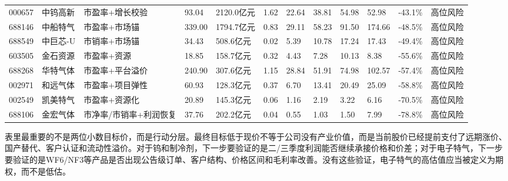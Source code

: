 \begin{exhibitbox}[完整估值总表]
{\begin{tabular}{llllllllllll}
000657 & 中钨高新 & 市盈率+增长校验 & 93.04 & 2120.0亿元 & 1.62 & 22.64 & 38.81 & 54.98 & 52.98 & -43.1\% & 高位风险 \\
688146 & 中船特气 & 市盈率+市场锚 & 339.00 & 1794.7亿元 & 0.83 & 29.11 & 58.23 & 91.50 & 174.66 & -48.5\% & 高位风险 \\
688549 & 中巨芯-U & 市销率+市场锚 & 34.43 & 508.6亿元 & 0.02 & 5.39 & 10.78 & 17.24 & 17.43 & -49.4\% & 高位风险 \\
603505 & 金石资源 & 市盈率+资源 & 18.85 & 158.7亿元 & 0.32 & 4.43 & 7.28 & 10.13 & 8.38 & -55.6\% & 高位风险 \\
688268 & 华特气体 & 市盈率+平台溢价 & 240.90 & 307.6亿元 & 1.15 & 28.84 & 51.91 & 74.98 & 102.57 & -57.4\% & 高位风险 \\
002971 & 和远气体 & 市盈率+项目弹性 & 60.93 & 128.3亿元 & 0.37 & 6.70 & 13.41 & 20.49 & 25.09 & -58.8\% & 高位风险 \\
002549 & 凯美特气 & 市盈率+资源化 & 20.89 & 145.3亿元 & 0.06 & 1.16 & 2.19 & 3.22 & 6.16 & -70.5\% & 高位风险 \\
688106 & 金宏气体 & 市净率/市销率+利润恢复 & 37.76 & 202.2亿元 & 0.04 & 0.55 & 1.03 & 1.50 & 7.99 & -78.8\% & 高位风险 \\
\bottomrule
\end{tabular}
}
\end{exhibitbox}

表里最重要的不是两位小数目标价，而是行动分层。最终目标低于现价不等于公司没有产业价值，而是当前股价已经提前支付了远期涨价、国产替代、客户认证和流动性溢价。对于钨和制冷剂，下一步要验证的是二/三季度利润能否继续承接价格和价差；对于电子特气，下一步要验证的是WF6/NF3等产品是否出现公告级订单、客户结构、价格区间和毛利率改善。没有这些验证，电子特气的高估值应当被定义为期权，而不是低估。

